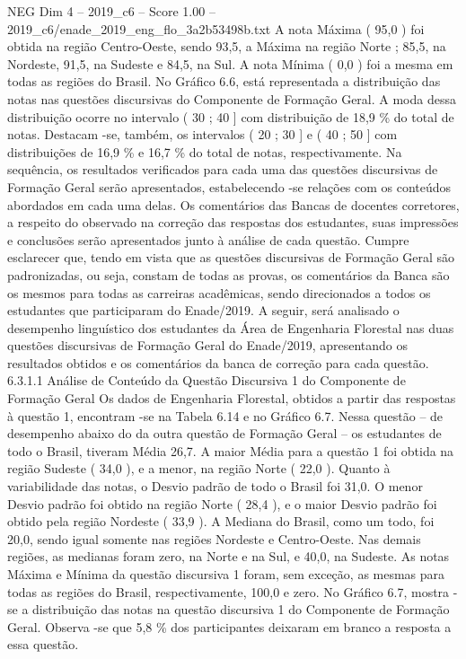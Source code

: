 \begin{textsample}{NEG Dim 4 – 2019\_c6 – Score 1.00 – 2019\_c6/enade\_2019\_eng\_flo\_3a2b53498b.txt}
A nota Máxima ( 95,0 ) foi obtida na região Centro-Oeste, sendo 93,5, a Máxima na região Norte ; 85,5, na Nordeste, 91,5, na Sudeste e 84,5, na Sul.
A nota Mínima ( 0,0 ) foi a mesma em todas as regiões do Brasil.
No Gráfico 6.6, está representada a distribuição das notas nas questões discursivas do Componente de Formação Geral.
A moda dessa distribuição ocorre no intervalo ( 30 ; 40 ] com distribuição de 18,9 \% do total de notas.
Destacam -se, também, os intervalos ( 20 ; 30 ] e ( 40 ; 50 ] com distribuições de 16,9 \% e 16,7 \% do total de notas, respectivamente.
Na sequência, os resultados verificados para cada uma das questões discursivas de Formação Geral serão apresentados, estabelecendo -se relações com os conteúdos abordados em cada uma delas.
Os comentários das Bancas de docentes corretores, a respeito do observado na correção das respostas dos estudantes, suas impressões e conclusões serão apresentados junto à análise de cada questão.
Cumpre esclarecer que, tendo em vista que as questões discursivas de Formação Geral são padronizadas, ou seja, constam de todas as provas, os comentários da Banca são os mesmos para todas as carreiras acadêmicas, sendo direcionados a todos os estudantes que participaram do Enade/2019.
A seguir, será analisado o desempenho linguístico dos estudantes da Área de Engenharia Florestal nas duas questões discursivas de Formação Geral do Enade/2019, apresentando os resultados obtidos e os comentários da banca de correção para cada questão. 6.3.1.1 Análise de Conteúdo da Questão Discursiva 1 do Componente de Formação Geral Os dados de Engenharia Florestal, obtidos a partir das respostas à questão 1, encontram -se na Tabela 6.14 e no Gráfico 6.7.
Nessa questão – de desempenho abaixo do da outra questão de Formação Geral – os estudantes de todo o Brasil, tiveram Média 26,7.
A maior Média para a questão 1 foi obtida na região Sudeste ( 34,0 ), e a menor, na região Norte ( 22,0 ).
Quanto à variabilidade das notas, o Desvio padrão de todo o Brasil foi 31,0.
O menor Desvio padrão foi obtido na região Norte ( 28,4 ), e o maior Desvio padrão foi obtido pela região Nordeste ( 33,9 ).
A Mediana do Brasil, como um todo, foi 20,0, sendo igual somente nas regiões Nordeste e Centro-Oeste.
Nas demais regiões, as medianas foram zero, na Norte e na Sul, e 40,0, na Sudeste.
As notas Máxima e Mínima da questão discursiva 1 foram, sem exceção, as mesmas para todas as regiões do Brasil, respectivamente, 100,0 e zero.
No Gráfico 6.7, mostra -se a distribuição das notas na questão discursiva 1 do Componente de Formação Geral.
Observa -se que 5,8 \% dos participantes deixaram em branco a resposta a essa questão.

\end{textsample}
